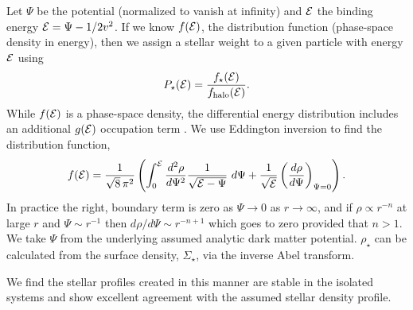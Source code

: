 Let \(\Psi\) be the potential (normalized to vanish at infinity) and
\({\cal E}\) the binding energy \({\cal E} = \Psi - 1/2 v^2\). If we
know \(f({\cal E})\), the distribution function (phase-space density in
energy), then we assign a stellar weight to a given particle with energy
\({\cal E}\) using \begin{equation}{
P_\star({\cal E}) = \frac{f_\star({\cal E})}{f_{\rm halo}({\cal E})}.
}\end{equation} While \(f({\cal E})\) is a phase-space density, the
differential energy distribution includes an additional \(g({\cal E})\)
occupation term \citep{BT1987}. We use Eddington inversion to find the
distribution function, \citep[eq. 4-140b in][]{BT1987} \begin{equation}{
f({\cal E}) = \frac{1}{\sqrt{8}\, \pi^2}\left( \int_0^{\cal E} \frac{d^2\rho}{d\Psi^2} \frac{1}{\sqrt{{\cal E} - \Psi}}\ d\Psi + \frac{1}{\sqrt{\cal E}} \left(\frac{d\rho}{d\Psi}\right)_{\Psi=0} \right).
}\end{equation} In practice the right, boundary term is zero as
\(\Psi \to 0\) as \(r\to\infty\), and if \(\rho \propto r^{-n}\) at
large \(r\) and \(\Psi \sim r^{-1}\) then
\(d\rho / d\Psi \sim r^{-n+1}\) which goes to zero provided that
\(n > 1\). We take \(\Psi\) from the underlying assumed analytic dark
matter potential. \(\rho_\star\) can be calculated from the surface
density, \(\Sigma_\star\), via the inverse Abel transform.

We find the stellar profiles created in this manner are stable in the
isolated systems and show excellent agreement with the assumed stellar
density profile.
